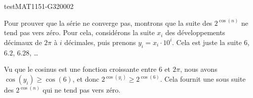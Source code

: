 \begin{corrige}{testMAT1151-G320002}



Pour prouver que la série ne converge pas, montrons que la suite des $2^{\cos(n)}$ ne tend pas vers zéro. Pour cela, considérons la suite $x_i$ des développements décimaux de $2\pi$ à $i$ décimales, puis prenons $y_i=x_i\cdot 10^i$. Cela est juste la suite $6$, $6.2$, $6.28$, \ldots

Vu que le cosinus est une fonction croissante entre $6$ et $2\pi$, nous avons $\cos(y_i)\geq\cos(6)$, et donc $2^{\cos(y_i)}\geq 2^{\cos(6)}$. Cela fournit une sous suite des $2^{\cos(n)}$ qui ne tend pas vers zéro.

\end{corrige}
